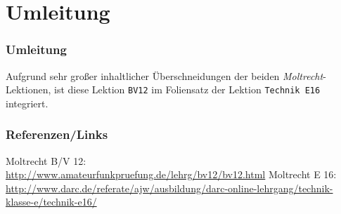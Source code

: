 

\subtitle{Betriebstechnik/Vorschriften 12: \\
          Digitale Betriebsarten \\[2em]}
\date{Stand 22.01.2015}


\section{Umleitung}

\begin{frame}
    \frametitle{Umleitung}

    Aufgrund sehr großer inhaltlicher Überschneidungen der beiden
    \emph{Moltrecht}-Lektionen, ist diese Lektion
    \texttt{BV12}\hyperlink{refs}{\cite{bv12}} im Foliensatz der Lektion
    \texttt{Technik E16}\hyperlink{refs}{\cite{e16}} integriert.

\end{frame}

\renewcommand{\refname}{Referenzen}

\begin{frame}
    \frametitle{Referenzen/Links}
    \hypertarget{refs}{}
    \footnotesize

    \begin{thebibliography}{}
          Moltrecht B/V 12: \\
                        \url{http://www.amateurfunkpruefung.de/lehrg/bv12/bv12.html}
           Moltrecht E 16: \\
                        \url{http://www.darc.de/referate/ajw/ausbildung/darc-online-lehrgang/technik-klasse-e/technik-e16/}
    \end{thebibliography} 
   
\end{frame}


